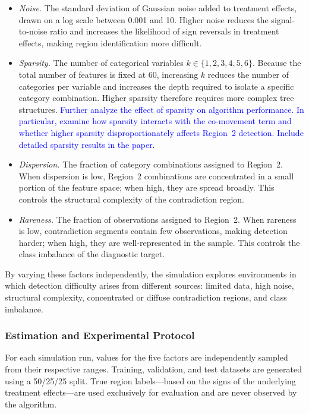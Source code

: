 \documentclass[11pt,letterpaper,english]{article}
\theoremstyle{definition}
\newcommand{\todo}[1]{\textcolor{blue}{#1}}
\theoremstyle{definition}
\begin{document}
\begin{bibunit}
\begin{itemize}[leftmargin=2em]
    \item \emph{Noise.}
    The standard deviation of Gaussian noise added to treatment effects, drawn on a log scale between 0.001 and 10. Higher noise reduces the signal-to-noise ratio and increases the likelihood of sign reversals in treatment effects, making region identification more difficult.

    \item \emph{Sparsity.}
    The number of categorical variables $k \in \{1, 2, 3, 4, 5, 6\}$. Because the total number of features is fixed at 60, increasing $k$ reduces the number of categories per variable and increases the depth required to isolate a specific category combination. Higher sparsity therefore requires more complex tree structures. \todo{Further analyze the effect of sparsity on algorithm performance. In particular, examine how sparsity interacts with the co-movement term and whether higher sparsity disproportionately affects Region~2 detection. Include detailed sparsity results in the paper.}

    \item \emph{Dispersion.}
    The fraction of category combinations assigned to Region~2. When dispersion is low, Region~2 combinations are concentrated in a small portion of the feature space; when high, they are spread broadly. This controls the structural complexity of the contradiction region.

    \item \emph{Rareness.}
    The fraction of observations assigned to Region~2. When rareness is low, contradiction segments contain few observations, making detection harder; when high, they are well-represented in the sample. This controls the class imbalance of the diagnostic target.
\end{itemize}

By varying these factors independently, the simulation explores environments in which detection difficulty arises from different sources: limited data, high noise, structural complexity, concentrated or diffuse contradiction regions, and class imbalance.

\subsubsection{Estimation and Experimental Protocol}
\label{sec:protocol}

For each simulation run, values for the five factors are independently sampled from their respective ranges. Training, validation, and test datasets are generated using a 50/25/25 split. True region labels---based on the signs of the underlying treatment effects---are used exclusively for evaluation and are never observed by the algorithm.


\end{bibunit}
\end{document}
